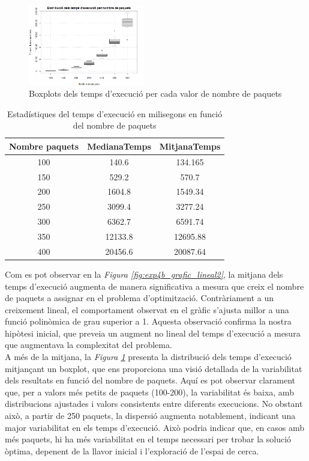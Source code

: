 \documentclass[a4paper]{article}
\begin{document}
	\begin{figure}[H]
		\centering
		\includegraphics[width=0.45\textwidth]{images/exp4b_boxplots.png}
		\caption{Boxplots dels temps d'execució per cada valor de nombre de paquets}
		\label{fig:exp4b_boxplots}
	\end{figure}
	
	\begin{table}[H]
		\centering
		\begin{tabular}{|c|c|c|}
			\hline
			\textbf{Nombre paquets} & \textbf{MedianaTemps} & \textbf{MitjanaTemps} \\
			\hline
			100 & 140.6 & 134.165\\
			\hline
			150& 529.2 & 570.7\\
			\hline
			200& 1604.8 & 1549.34\\
			\hline
			250& 3099.4 & 3277.24\\
			\hline
			300& 6362.7 & 6591.74\\
			\hline
			350& 12133.8 & 12695.88\\
			\hline
			400& 20456.6 & 20087.64\\
			\hline
		\end{tabular}
		\caption{Estadístiques del temps d'execució en milisegons en funció del nombre de paquets}
		\label{tab:C}
	\end{table}

	Com es pot observar en la \textit{Figura \ref{fig:exp4b_grafic_lineal2}}, la mitjana dels temps d'execució augmenta de manera significativa a mesura que creix el nombre de paquets a assignar en el problema d'optimització. Contràriament a un creixement lineal, el comportament observat en el gràfic s'ajusta millor a una funció polinòmica de grau superior a 1. Aquesta observació confirma la nostra hipòtesi inicial, que preveia un augment no lineal del temps d'execució a mesura que augmentava la complexitat del problema.\\
	A més de la mitjana, la \textit{Figura \ref{fig:exp4b_boxplots}} presenta la distribució dels temps d'execució mitjançant un boxplot, que ens proporciona una visió detallada de la variabilitat dels resultats en funció del nombre de paquets. Aquí es pot observar clarament que, per a valors més petits de paquets (100-200), la variabilitat és baixa, amb distribucions ajustades i valors consistents entre diferents execucions. No obstant això, a partir de 250 paquets, la dispersió augmenta notablement, indicant una major variabilitat en els temps d'execució. Això podria indicar que, en casos amb més paquets, hi ha més variabilitat en el temps necessari per trobar la solució òptima, depenent de la llavor inicial i l'exploració de l'espai de cerca.\\
	
\end{document}

